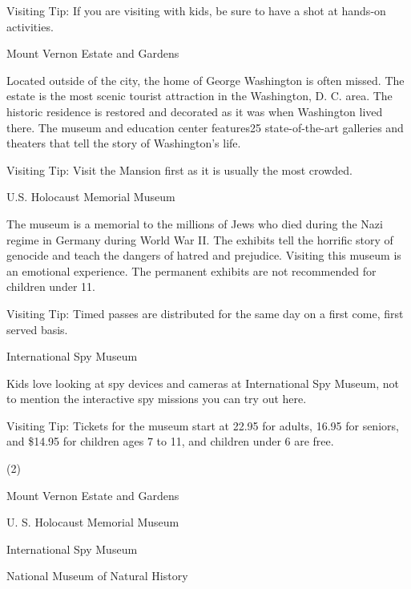 \documentclass{英语试卷}
\begin{document}
\par Visiting Tip: If you are visiting with kids, be sure to have a shot at hands-on activities.\par
\par Mount Vernon Estate and Gardens\par
\par Located outside of the city, the home of George Washington is often missed. The estate is the most scenic tourist attraction in the Washington, D. C. area. The historic residence is restored and decorated as it was when Washington lived there. The museum and education center features25 state-of-the-art galleries and theaters that tell the story of Washington's life.\par
\par Visiting Tip: Visit the Mansion first as it is usually the most crowded.\par
\par U.S. Holocaust Memorial Museum\par
\par The museum is a memorial to the millions of Jews who died during the Nazi regime in Germany during World War II. The exhibits tell the horrific story of genocide and teach the dangers of hatred and prejudice. Visiting this museum is an emotional experience. The permanent exhibits are not recommended for children under 11.\par
\par Visiting Tip: Timed passes are distributed for the same day on a first come, first served basis.\par
\par International Spy Museum\par
\par Kids love looking at spy devices and cameras at International Spy Museum, not to mention the interactive spy missions you can try out here.\par
\par Visiting Tip: Tickets for the museum start at 22.95 for adults, 16.95 for seniors, and \$14.95 for children ages 7 to 11, and children under 6 are free.\par
{}
\begin{choices}(2)
  \item Mount Vernon Estate and Gardens
  \item U. S. Holocaust Memorial Museum
  \item International Spy Museum
  \item National Museum of Natural History
\end{choices}
\end{document}
